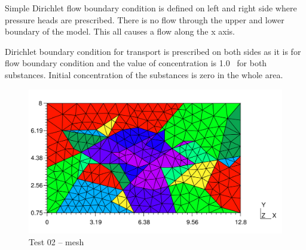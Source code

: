 Simple Dirichlet flow boundary condition is defined on left and right side where pressure heads are prescribed. 
There is no flow through the upper and lower boundary of the model. This all causes a flow along the x axis.

Dirichlet boundary condition for transport is prescribed on both sides as it is for flow boundary condition and 
the value of concentration is 1.0~ for both substances. Initial concentration of the substances 
is zero in the whole area. 
%
\begin{figure}[htb!]
\centering
\includegraphics[width=15cm]{tests_graphics/02_mesh.pdf}
\caption{Test 02 -- mesh}
\label{fig:test2_mesh}
\end{figure}
%
%
